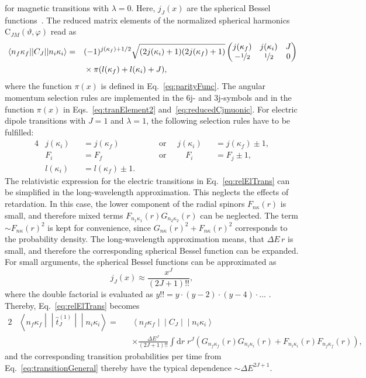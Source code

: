for magnetic transitions with $\lambda = 0$. Here, $j_J(x)$ are the spherical Bessel functions~\cite[Eq. 10.47.3]{NIST:DLMF}.
The reduced matrix elements of the normalized spherical harmonics $\text{C}_{JM}(\vartheta,\varphi)$ read as~\cite{johnson2007}
\begin{alignat}{2}
&\left<n_f\kappa_f\middle|\middle|C_J\middle|\middle|n_i\kappa_i\right>=&&(-1)^{j(\kappa_f)+1/2}\sqrt{(2j(\kappa_i)+1)(2j(\kappa_f)+1)}
\begin{pmatrix}
j(\kappa_f)&j(\kappa_i)&J\\
-\nicefrac{1}{2}&\nicefrac{1}{2}&0
\end{pmatrix}
\notag\\
&&&\times\pi(l(\kappa_f)+l(\kappa_i)+J),
\label{eq:reducedCjmuonic}
\end{alignat}
where the function $\pi(x)$ is defined in Eq.~\eqref{eq:parityFunc}. The angular momentum selection rules are implemented in the 6j- and 3j-symbols and in the function $\pi(x)$ in Eqs.~\eqref{eq:tranElement2} and~\eqref{eq:reducedCjmuonic}. For electric dipole transitions with $J=1$ and $\lambda=1$, the following selection rules have to be fulfilled:
\begin{alignat}{4}
&j(\kappa_i)&&=j(\kappa_f) &&\quad\text{ or }\quad j(\kappa_i)&&=j(\kappa_f)\pm 1,\\
&F_i &&= F_f &&\quad\text{ or }\quad\quad F_i&&=F_j\pm 1,\\
&l(\kappa_i)&&=l(\kappa_f)\pm 1.
\label{eq:dipoleSelectionRules}
\end{alignat}
The relativistic expression for the electric transitions in Eq.~\eqref{eq:relElTrans} can be simplified in the long-wavelength approximation. This neglects the effects of retardation. In this case, the lower component of the radial spinors $F_{n\kappa}(r)$ is small, and therefore mixed terms $F_{n_1\kappa_1}(r)G_{n_2\kappa_2}(r)$ can be neglected. The term $\sim F_{n\kappa}(r)^2$ is kept for convenience, since $G_{n\kappa}(r)^2+F_{n\kappa}(r)^2$ corresponds to the probability density. The long-wavelength approximation means, that $\Delta E \, r$ is small, and therefore the corresponding spherical Bessel function can be expanded. For small arguments, the spherical Bessel functions can be approximated as
\begin{equation}
j_J(x)\approx \frac{x^J}{(2J+1)!!},
\end{equation}
where the double factorial is evaluated as $y!! = y \cdot (y-2) \cdot (y-4) \cdot ...\,\,$. Thereby, Eq.~\eqref{eq:relElTrans} becomes
\begin{alignat}{2}
\label{eq:relElTransNR}
&\left< n_{f}\kappa_{f}\middle|\middle|\hat{t}^{(1)}_{J}\middle|\middle|n_{i}\kappa_{i}\right>=&&
\left<n_f\kappa_f\middle|\middle|C_J\middle|\middle|n_i\kappa_i\right>\\
&&&\times\frac{\Delta E^J}{(2J+1)!!}\int\text{d}r \;r^J\left(G_{n_f\kappa_f}(r)G_{n_i\kappa_i}(r)+F_{n_i\kappa_i}(r)F_{n_f\kappa_f}(r)\right),
\end{alignat}
and the corresponding transition probabilities per time from Eq.~\eqref{eq:transitionGeneral} thereby have the typical dependence $\sim \Delta E ^{2J+1}$.\\

